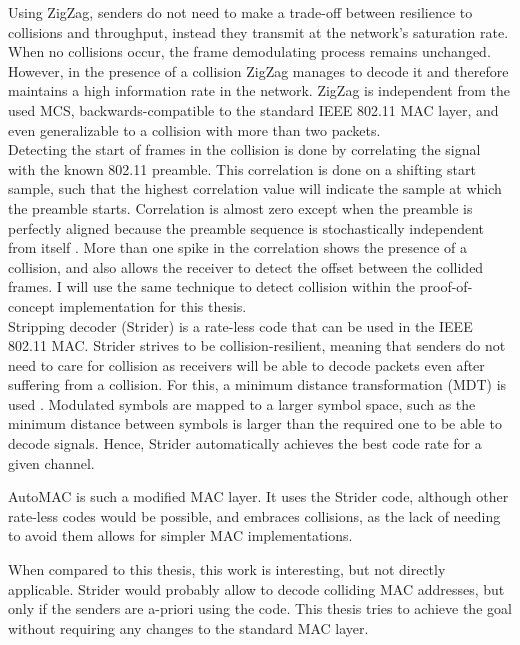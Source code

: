 Using ZigZag, senders do not need to make a trade-off between resilience to collisions and throughput, instead they transmit at the network's saturation rate. When no collisions occur, the frame demodulating process remains unchanged. However, in the presence of a collision ZigZag manages to decode it and therefore maintains a high information rate in the network. ZigZag is independent from the used \gls{MCS}, backwards-compatible to the standard IEEE 802.11 MAC layer, and even generalizable to a collision with more than two packets.\\

Detecting the start of frames in the collision is done by correlating the signal with the known 802.11 preamble. This correlation is done on a shifting start sample, such that the highest correlation value will indicate the sample at which the preamble starts. Correlation is almost zero except when the preamble is perfectly aligned because the preamble sequence is stochastically independent from itself \cite{ieee2012}. More than one spike in the correlation shows the presence of a collision, and also allows the receiver to detect the offset between the collided frames. I will use the same technique to detect collision within the proof-of-concept implementation for this thesis.\\

Stripping decoder (Strider) \cite{gudipati2011} is a rate-less code that can be used in the IEEE 802.11 MAC. Strider strives to be collision-resilient, meaning that senders do not need to care for collision as receivers will be able to decode packets even after suffering from a collision. For this, a minimum distance transformation (MDT) is used \cite{gudipati2011}. Modulated symbols are mapped to a larger symbol space, such as the minimum distance between symbols is larger than the required one to be able to decode signals. Hence, Strider automatically achieves the best code rate for a given channel.

AutoMAC \cite{gudipati2012} is such a modified MAC layer. It uses the Strider code, although other rate-less codes would be possible, and embraces collisions, as the lack of needing to avoid them allows for simpler MAC implementations.

When compared to this thesis, this work is interesting, but not directly applicable. Strider would probably allow to decode colliding MAC addresses, but only if the senders are a-priori using the code. This thesis tries to achieve the goal without requiring any changes to the standard MAC layer.\\

